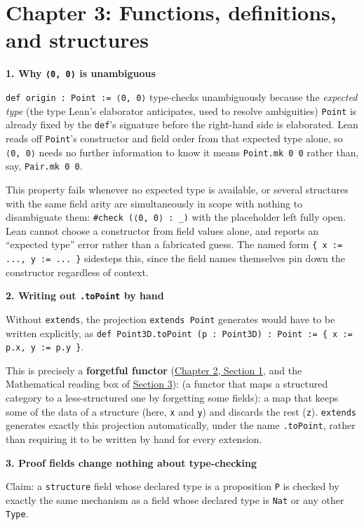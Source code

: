 \section{Chapter 3: Functions, definitions, and structures}\label{sec:15-appendix-solutions:03-chapter-3:1}

\textbf{1. Why \texttt{⟨0, 0⟩} is unambiguous}

\texttt{def origin : Point := ⟨0, 0⟩} type-checks unambiguously because the \emph{expected type} (the type Lean's elaborator anticipates, used to resolve ambiguities) \texttt{Point} is already fixed by the \texttt{def}'s signature before the right-hand side is elaborated. Lean reads off \texttt{Point}'s constructor and field order from that expected type alone, so \texttt{⟨0, 0⟩} needs no further information to know it means \texttt{Point.mk 0 0} rather than, say, \texttt{Pair.mk 0 0}.

This property fails whenever no expected type is available, or several structures with the same field arity are simultaneously in scope with nothing to disambiguate them: \texttt{\#check (⟨0, 0⟩ : \_\allowbreak{})} with the placeholder left fully open. Lean cannot choose a constructor from field values alone, and reports an ``expected type'' error rather than a fabricated guess. The named form \texttt{\{ x := ..., y := ... \}} sidesteps this, since the field names themselves pin down the constructor regardless of context.

\textbf{2. Writing out \texttt{.toPoint} by hand}

Without \texttt{extends}, the projection \texttt{extends Point} generates would have to be written explicitly, as \texttt{def Point3D.toPoint (p : Point3D) : Point := \{ x := p.x, y := p.y \}}.

This is precisely a \textbf{forgetful functor} (\hyperref[sec:02-terminology-and-coc:01-terminology:1]{Chapter 2, Section 1}, and the Mathematical reading box of \hyperref[sec:03-functions-and-structures:03-extending-structures:1]{Section 3}): (a functor that maps a structured category to a less-structured one by forgetting some fields): a map that keeps some of the data of a structure (here, \texttt{x} and \texttt{y}) and discards the rest (\texttt{z}). \texttt{extends} generates exactly this projection automatically, under the name \texttt{.toPoint}, rather than requiring it to be written by hand for every extension.

\textbf{3. Proof fields change nothing about type-checking}

Claim: a \texttt{structure} field whose declared type is a proposition \texttt{P} is checked by exactly the same mechanism as a field whose declared type is \texttt{Nat} or any other \texttt{Type}.

